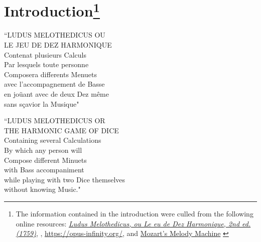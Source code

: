 \documentclass[a4paper,x11names,svgnames,10pt]{article}
\begin{document}
{\section[Introduction]{Introduction\footnote{The information contained in the introduction were culled from the following online resources:
		\href{https://imslp.org/wiki/Ludus_Melothedicus_(Anonymous)}{\it Ludus Melothedicus, ou Le eu de Dez Harmonique, 2nd ed. (1759)}, 
		\citet{wiki_mw2017},
		\url{https://opus-infinity.org/}, and 
		\href{https://www.sciencenews.org/article/mozarts-melody-machine-0}{Mozart's Melody Machine} \citep*{peterson2001}
	}
}
\begin{center}
	\begin{minipage}{0.4\textwidth}
		\begin{flushleft}
			\begin{center}
				``\small LUDUS MELOTHEDICUS OU \\ LE JEU DE DEZ HARMONIQUE \\
				Contenat plusieurs Calculs \\
				Par lesquels toute personne \\ Composera differents Menuets \\ 
				avec l'accompagnement de Basse  \\
				en jo\"{u}ant avec de deux Dez m\^{e}me  \\
				sans s\c{c}avior la Musique"
			\end{center}
		\end{flushleft}
	\end{minipage}
	\begin{minipage}{0.4\textwidth}
		\begin{flushright}
			\begin{center}
				``\small LUDUS MELOTHEDICUS OR \\ THE HARMONIC GAME OF DICE \\
				Containing several Calculations \\ 
				By which any person will \\
				Compose different Minuets \\ 
				with Bass accompaniment \\
				while playing with two Dice themselves \\ 
				without knowing Music."
			\end{center}
		\end{flushright}
	\end{minipage}
\end{center}

}
\end{document}
